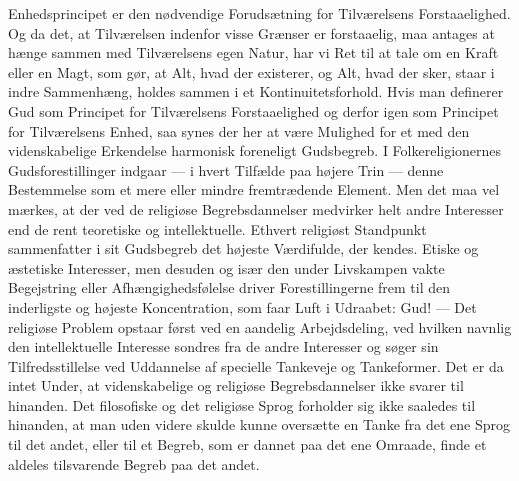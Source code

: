 \documentclass[12pt,a4paper,openany]{book}
\newcommand{\opage}[1]{\marginnote{\footnotesize\textit{[#1]}}}
\begin{document}
Enhedsprincipet er den nødvendige Forudsætning for Tilværelsens
Forstaaelighed. Og da det, at Tilværelsen indenfor visse Grænser er
forstaaelig, maa antages at hænge sammen med Tilværelsens egen Natur,
har vi Ret til at tale om en Kraft eller en Magt, som gør, at Alt, hvad
der existerer, og Alt, hvad der sker, staar i indre Sammenhæng, holdes
sammen i et Kontinuitetsforhold. Hvis man definerer Gud som Principet
for Tilværelsens Forstaaelighed og derfor igen som Principet for
Tilværelsens Enhed,
\opage{35}saa synes der her at være Mulighed for et med den
videnskabelige Erkendelse harmonisk foreneligt Gudsbegreb. I
Folkereligionernes Gudsforestillinger indgaar --- i hvert Tilfælde paa
højere Trin --- denne Bestemmelse som et mere eller mindre fremtrædende
Element. Men det maa vel mærkes, at der ved de religiøse
Begrebsdannelser medvirker helt andre Interesser end de rent teoretiske
og intellektuelle. Ethvert religiøst Standpunkt sammenfatter i sit
Gudsbegreb det højeste Værdifulde, der kendes. Etiske og æstetiske
Interesser, men desuden og især den under Livskampen vakte Begejstring
eller Afhængighedsfølelse driver Forestillingerne frem til den
inderligste og højeste Koncentration, som faar Luft i Udraabet: Gud! ---
Det religiøse Problem opstaar først ved en aandelig Arbejdsdeling, ved
hvilken navnlig den intellektuelle Interesse sondres fra de andre
Interesser og søger sin Tilfredsstillelse ved Uddannelse af specielle
Tankeveje og Tankeformer. Det er da intet Under, at videnskabelige og
religiøse Begrebsdannelser ikke svarer til hinanden. Det filosofiske og
det religiøse Sprog forholder sig ikke saaledes til hinanden, at man
uden videre skulde kunne oversætte en Tanke fra det ene Sprog til det
andet, eller til et Begreb, som er dannet paa det ene Omraade, finde et
aldeles tilsvarende Begreb paa det andet.
\end{document}
